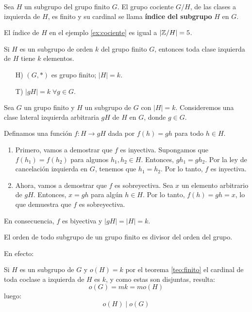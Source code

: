 \begin{fmd-definition}
	Sea $H$ un subgrupo del grupo finito $G$. El grupo cociente $G/H$, de las clases a izquierda de $H$, es finito y su cardinal se llama \textbf{índice del subgrupo} $H$ en $G$.
\end{fmd-definition}

El índice de $H$ en el ejemplo \ref{ex:cociente} es igual a $|\mathbb{Z}/H| = 5$.

\begin{fmd-theorem} \label{teo:finito}
Si $H$ es un subgrupo de orden $k$ del grupo finito $G$, entonces toda clase izquierda de $H$ tiene $k$ elementos.

\begin{itemize}
	\item[H)] $(G, *)$ es grupo finito; $|H| = k$.
	\item[T)] $|gH| = k \; \forall g \in G$.
\end{itemize}
\end{fmd-theorem}
\begin{fmd-proof}
Sea $G$ un grupo finito y $H$ un subgrupo de $G$ con $|H|=k$. Consideremos una clase lateral izquierda arbitraria $gH$ de $H$ en $G$, donde $g \in G$.

Definamos una función $f:H \rightarrow gH$ dada por $f(h)=gh$ para todo $h \in H$.
	\begin{enumerate}[label=\roman*)]
		\item Primero, vamos a demostrar que $f$ es inyectiva. Supongamos que $f(h_1)=f(h_2)$ para algunos $h_1, h_2 \in H$. Entonces, $gh_1 = gh_2$. Por la ley de cancelación izquierda en $G$, tenemos que $h_1 = h_2$.  Por lo tanto, $f$ es inyectiva.
		\item Ahora, vamos a demostrar que $f$ es sobreyectiva. Sea $x$ un elemento arbitrario de $gH$. Entonces, $x=gh$ para algún $h \in H$. Por lo tanto, $f(h)=gh=x$, lo que demuestra que $f$ es sobreyectiva.
	\end{enumerate}
	En consecuencia, $f$ es biyectiva y $|gH| = |H| = k$.
\end{fmd-proof}

\begin{fmd-theorem}[Lagrange] \label{teo:Lagrange}
	El orden de todo subgrupo de un grupo finito es divisor del orden del grupo.
\end{fmd-theorem}

\begin{fmd-proof} En efecto:
	
	Si $H$ es un subgrupo  de $G$ y $o(H) = k$ por el teorema \ref{teo:finito} el cardinal de toda coclase a izquierda de $H$ es $k$, y como estas son disjuntas, resulta:
	\[ o(G) = mk = m o(H) \]
	luego:
	\[ o(H) \mid o(G) \]
\end{fmd-proof}



